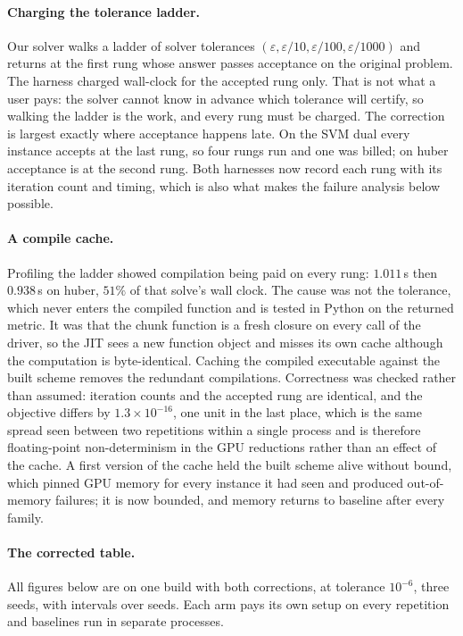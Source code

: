 \documentclass[11pt]{article}
\begin{document}
\paragraph{Charging the tolerance ladder.}
Our solver walks a ladder of solver tolerances
$(\varepsilon, \varepsilon/10, \varepsilon/100, \varepsilon/1000)$ and
returns at the first rung whose answer passes acceptance on the original
problem. The harness charged wall-clock for the accepted rung only. That is
not what a user pays: the solver cannot know in advance which tolerance will
certify, so walking the ladder is the work, and every rung must be charged.
The correction is largest exactly where acceptance happens late. On the SVM
dual every instance accepts at the last rung, so four rungs run and one was
billed; on huber acceptance is at the second rung. Both harnesses now record
each rung with its iteration count and timing, which is also what makes the
failure analysis below possible.

\paragraph{A compile cache.}
Profiling the ladder showed compilation being paid on every rung: $1.011$\,s
then $0.938$\,s on huber, $51\%$ of that solve's wall clock. The cause was
not the tolerance, which never enters the compiled function and is tested in
Python on the returned metric. It was that the chunk function is a fresh
closure on every call of the driver, so the JIT sees a new function object
and misses its own cache although the computation is byte-identical. Caching
the compiled executable against the built scheme removes the redundant
compilations. Correctness was checked rather than assumed: iteration counts
and the accepted rung are identical, and the objective differs by
$1.3\times10^{-16}$, one unit in the last place, which is the same spread
seen between two repetitions within a single process and is therefore
floating-point non-determinism in the GPU reductions rather than an effect of
the cache. A first version of the cache held the built scheme alive without
bound, which pinned GPU memory for every instance it had seen and produced
out-of-memory failures; it is now bounded, and memory returns to baseline
after every family.

\paragraph{The corrected table.}
All figures below are on one build with both corrections, at tolerance
$10^{-6}$, three seeds, with intervals over seeds. Each arm pays its own
setup on every repetition and baselines run in separate processes.
\end{document}
